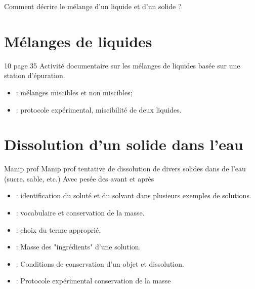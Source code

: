 \documentclass[12pt,a4paper]{article}
\date{}
\title{}
\begin{document}
	
	




\begin{mypb}
	Comment décrire le mélange d'un liquide et d'un solide ?
\end{mypb}


\section{Mélanges de liquides}

\begin{myact}{10 page 35}
	Activité documentaire sur les mélanges de liquides basée sur une station d'épuration.
\end{myact}



\begin{myexos}
	\begin{itemize}
		\item {} : mélanges miscibles et non miscibles;
		\item {} : protocole expérimental, miscibilité de deux liquides.
	\end{itemize}
\end{myexos}


\section{Dissolution d'un solide dans l'eau}

\begin{myact}{Manip prof}
	Manip prof tentative de dissolution de divers solides dans de l'eau (sucre, sable, etc.)
	Avec pesée des avant et après
\end{myact}




\begin{myexos}
	\begin{itemize}
		\item {} : identification du soluté et du solvant dans plusieurs exemples de solutions.
		\item {} : vocabulaire et conservation de la masse.
		\item {} : choix du terme approprié.
		\item {} : Masse des "ingrédients" d'une solution.
		\item {} : Conditions de conservation d'un objet et dissolution.
		\item {} : Protocole expérimental conservation de la masse
		
	\end{itemize}
\end{myexos}
\end{document}
